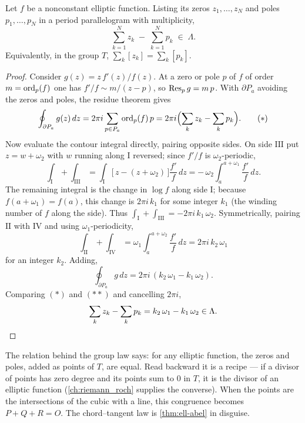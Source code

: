 \begin{theorem}
\label{thm:ell-abel}
Let \(f\) be a nonconstant elliptic function. Listing its zeros \(z_1, \dots,
z_N\) and poles \(p_1, \dots, p_N\) in a period parallelogram with multiplicity,
\[
  \sum_{k=1}^{N} z_k \;-\; \sum_{k=1}^{N} p_k \;\in\; \Lambda .
\]
Equivalently, in the group \(T\), \(\sum_k [z_k] = \sum_k [p_k]\).
\end{theorem}

\begin{proof}
Consider \(g(z) = z\,f'(z)/f(z)\). At a zero or pole \(p\) of \(f\) of order
\(m = \operatorname{ord}_p(f)\) one has \(f'/f \sim m/(z-p)\), so \(\operatorname{Res}_p g = m\,p\). With
\(\partial P_a\) avoiding the zeros and poles, the residue theorem gives
\[
  \oint_{\partial P_a} g(z)\,dz
  = 2\pi i \sum_{p \in P_a} \operatorname{ord}_p(f)\, p
  = 2\pi i\Bigl( \sum_k z_k - \sum_k p_k \Bigr).
\tag{$\ast$}
\]
Now evaluate the contour integral directly, pairing opposite sides. On side
\(\mathrm{III}\) put \(z = w + \omega_2\) with \(w\) running along
\(\mathrm{I}\) reversed; since \(f'/f\) is \(\omega_2\)-periodic,
\[
  \int_{\mathrm{I}} + \int_{\mathrm{III}}
  = \int_{\mathrm{I}} \bigl[\, z - (z+\omega_2) \,\bigr]\frac{f'}{f}\,dz
  = -\,\omega_2 \int_{a}^{a+\omega_1} \frac{f'}{f}\,dz .
\]
The remaining integral is the change in \(\log f\) along side \(\mathrm{I}\);
because \(f(a+\omega_1) = f(a)\), this change is \(2\pi i\,k_1\) for some integer
\(k_1\) (the winding number of \(f\) along the side). Thus
\(\int_{\mathrm{I}} + \int_{\mathrm{III}} = -2\pi i\,k_1\,\omega_2\). Symmetrically,
pairing \(\mathrm{II}\) with \(\mathrm{IV}\) and using
\(\omega_1\)-periodicity,
\[
  \int_{\mathrm{II}} + \int_{\mathrm{IV}}
  = \omega_1 \int_{a}^{a+\omega_2} \frac{f'}{f}\,dz
  = 2\pi i\,k_2\,\omega_1
\]
for an integer \(k_2\). Adding,
\[
  \oint_{\partial P_a} g\,dz = 2\pi i\,( k_2\,\omega_1 - k_1\,\omega_2 ).
\tag{$\ast\ast$}
\]
Comparing \((\ast)\) and \((\ast\ast)\) and cancelling \(2\pi i\),
\[
  \sum_k z_k - \sum_k p_k = k_2\,\omega_1 - k_1\,\omega_2 \in \Lambda . \qedhere
\]
\end{proof}

\begin{keyidea}{The relation behind the group law}
 says: for any elliptic function, the zeros and poles, added
as points of \(T\), are equal. Read backward it is a recipe --- if a divisor of
points has zero degree and its points sum to \(0\) in \(T\), it is the divisor of
an elliptic function (\cref{ch:riemann_roch} supplies the converse). When the
points are the intersections of the cubic with a line, this congruence becomes
\(P + Q + R = O\). The chord--tangent law is \cref{thm:ell-abel} in disguise.
\end{keyidea}

